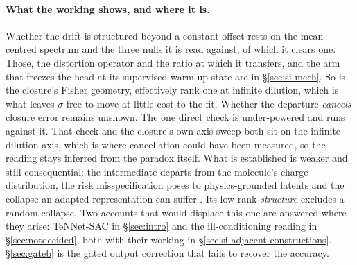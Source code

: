 \paragraph{What the working shows, and where it is.} Whether the drift is structured beyond a
constant offset rests on the mean-centred spectrum and the three nulls it is read against, of which
it clears one. Those, the distortion operator and the ratio at which it transfers, and the arm that
freezes the head at its supervised warm-up state are in \S\ref{sec:si-mech}. So is the closure's
Fisher geometry, effectively rank one at infinite dilution, which is what leaves $\sigma$ free to
move at little cost to the fit. Whether the departure \emph{cancels} closure error remains unshown.
The one direct check is under-powered and runs against it. That check and the closure's own-axis
sweep both sit on the infinite-dilution axis, which is where cancellation could have been measured,
so the reading stays inferred from the paradox itself. What is established is weaker and still
consequential: the intermediate departs from the molecule's charge distribution, the risk
misspecification poses to physics-grounded latents \cite{brynjarsdottir2014,takeishi2021} and the
collapse an adapted representation can suffer \cite{interno2026}. Its low-rank \emph{structure}
excludes a random collapse. Two accounts that would displace this one are answered where they
arise: TeNNet-SAC in \S\ref{sec:intro} and the ill-conditioning reading in \S\ref{sec:notdecided},
both with their working in \S\ref{sec:si-adjacent-constructions}. \S\ref{sec:gateb} is the gated
output correction that fails to recover the accuracy.

